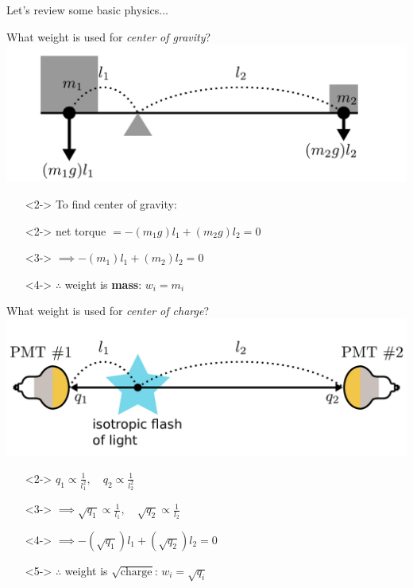 \documentclass[14pt]{beamer}
\begin{document}
\begin{frame}{Let's review some basic physics...}
	
\end{frame}

\begin{frame}{What weight is used for \emph{center of gravity}?}
	\includegraphics[width=\linewidth]{simple_example_of_center_of_gravity.pdf}
	\begin{itemize}
		\item[]<2-> To find center of gravity:
		\item[]<2-> net torque $= -(m_1 g) l_1 + (m_2 g) l_2 = 0$
		\item[]<3-> $\implies -(m_1) l_1 + (m_2) l_2 = 0$
		\item[]<4-> $\therefore$ weight is \textbf{mass}: $w_{i} = m_{i}$
	\end{itemize}
\end{frame}

\begin{frame}{What weight is used for \emph{\color{magenta}center of charge}?}
	\includegraphics[width=\linewidth]{simple_example_of_center_of_charge.pdf}
	\begin{itemize}
		\item[]<2-> $q_1 \propto \frac{1}{l_1^2}, \quad q_2 \propto
			\frac{1}{l_2^2}$
		\item[]<3-> $\implies \sqrt{q_1} \propto \frac{1}{l_1}, \quad \sqrt{q_2}
			\propto \frac{1}{l_2}$
		\item[]<4-> $\implies -(\sqrt{q_1}){l_1} + (\sqrt{q_2}){l_2} = 0$
		\item[]<5-> $\therefore$ weight is \textbf{$\sqrt{\text{charge}}$}:
			$w_{i} = \sqrt{q_{i}}$
	\end{itemize}
\end{frame}
\end{document}
